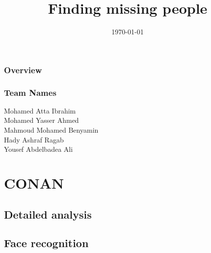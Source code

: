 \documentclass{beamer}
\title[Conan]{Finding missing people
} %
\institute[CSE] %
{Supervisor: Dr.  Mahmoud Khalil\\
	Department of Computer and Systems Engineering\\
	Faculty of Engineering at Ain Shams University \\ %
	\medskip
	\textit{} %
}
\date{\today} %
\begin{document}
	
	\begin{frame}
		\titlepage %
	\end{frame}
	
	\begin{frame}
		\frametitle{Overview} %
		\tableofcontents %
	\end{frame}
	
	
	\begin{frame}
		\frametitle{Team Names}
		\begin{center}
			Mohamed Atta Ibrahim \\Mohamed Yasser Ahmed
			\\Mahmoud Mohamed Benyamin\\ Hady Ashraf Ragab\\Yousef Abdelbadea Ali
			\vspace{2mm}
		\end{center}
	\end{frame}
	
	
	
	
	
	\section{CONAN} %
	
	\subsection{Detailed analysis}
	\subsection{Face recognition}
\end{document}
